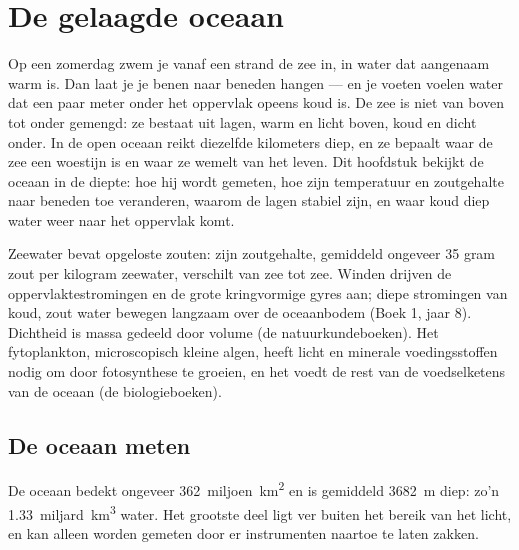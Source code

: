 \chapter{De gelaagde oceaan}\label{ch:g10:layered-ocean}

Op een zomerdag zwem je vanaf een strand de zee in, in water dat aangenaam warm
is. Dan laat je je benen naar beneden hangen --- en je voeten voelen water dat
een paar meter onder het oppervlak opeens koud is. De zee is niet van boven tot
onder gemengd: ze bestaat uit lagen, warm en licht boven, koud en dicht onder.
In de open oceaan reikt diezelfde  kilometers diep, en ze bepaalt waar
de zee een woestijn is en waar ze wemelt van het leven. Dit hoofdstuk bekijkt de
oceaan in de diepte: hoe hij wordt gemeten, hoe zijn temperatuur en zoutgehalte
naar beneden toe veranderen, waarom de lagen stabiel zijn, en waar koud diep
water weer naar het oppervlak komt.

\begin{recall}
Zeewater bevat opgeloste zouten: zijn zoutgehalte, gemiddeld ongeveer 35 gram
zout per kilogram zeewater, verschilt van zee tot zee. Winden drijven de
oppervlaktestromingen en de grote kringvormige gyres aan; diepe stromingen van
koud, zout water bewegen langzaam over de oceaanbodem (Boek 1, jaar 8).
Dichtheid is massa gedeeld door volume (de natuurkundeboeken). Het
fytoplankton, microscopisch kleine algen, heeft licht en minerale
voedingsstoffen nodig om door fotosynthese te groeien, en het voedt de rest van
de voedselketens van de oceaan (de biologieboeken).
\end{recall}

\section{De oceaan meten}

De oceaan bedekt ongeveer \num{362}~miljoen~\unit{km^2} en is gemiddeld
\qty{3682}{m} diep: zo'n \num{1.33}~miljard~\unit{km^3} water. Het grootste deel
ligt ver buiten het bereik van het licht, en kan alleen worden gemeten door er
instrumenten naartoe te laten zakken.

